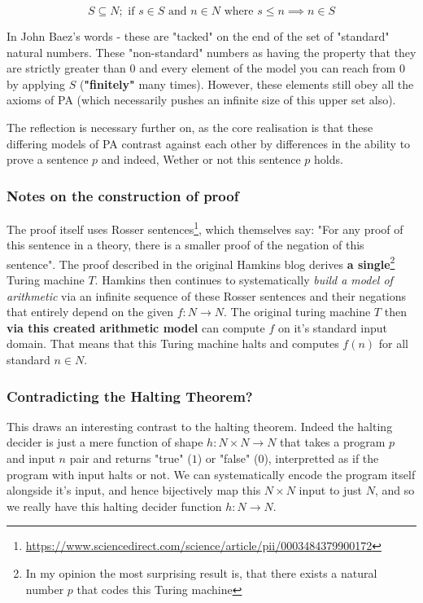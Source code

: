 \documentclass{article}
\begin{document}
\begin{equation}
	S \subseteq N; \text{ if } s \in S \text { and } n \in N \text{ where } s \leq n \implies n \in S
\end{equation}

In John Baez's words - these are "tacked" on the end of the set of "standard" natural numbers. These "non-standard" numbers as having the property that they are strictly greater than $0$ and every element of the model you can reach from 0 by applying $S$ (\textbf{"finitely"} many times). However, these elements still obey all the axioms of PA (which necessarily pushes an infinite size of this upper set also).

The reflection is necessary further on, as the core realisation is that these differing models of PA contrast against each other by differences in the ability to prove a sentence $p$ and indeed, Wether or not this sentence $p$ holds.

\subsubsection{Notes on the construction of proof}
The proof itself uses Rosser sentences\footnote{\url{https://www.sciencedirect.com/science/article/pii/0003484379900172}}, which themselves say: "For any proof of this sentence in a theory, there is a smaller proof of the negation of this sentence". The proof described in the original Hamkins blog derives \textbf{a single}\footnote{In my opinion the most surprising result is, that there exists a natural number $p$ that codes this Turing machine} Turing machine $T$. Hamkins then continues to systematically \emph{build a model of arithmetic} via an infinite sequence of these Rosser sentences and their negations that entirely depend on the given $f: N \rightarrow N$. The original turing machine $T$ then \textbf{via this created arithmetic model} can compute $f$ on it's standard input domain. That means that this Turing machine halts and computes $f(n)$ for all standard $n \in N$.

\subsubsection{Contradicting the Halting Theorem?}
This draws an interesting contrast to the halting theorem. Indeed the halting decider is just a mere function of shape $h: N \times N \rightarrow N$ that takes a program $p$ and input $n$ pair and returns "true" ($1$) or "false" ($0$), interpretted as if the program with input halts or not. We can systematically encode the program itself alongside it's input, and hence bijectively map this $N \times N$ input to just $N$, and so we really have this halting decider function $h: N \rightarrow N$.
\end{document}
